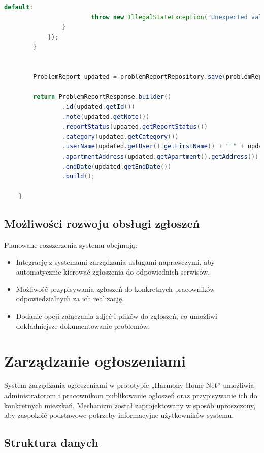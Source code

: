 \begin{lstlisting}[language=Java, style=JavaStyle, caption=Aktualizacja zgłoszenia problemu.]
                    default:
                        throw new IllegalStateException("Unexpected value: " + notificationType.getType());
                }
            });
        }


        ProblemReport updated = problemReportRepository.save(problemReportToUpdate);

        return ProblemReportResponse.builder()
                .id(updated.getId())
                .note(updated.getNote())
                .reportStatus(updated.getReportStatus())
                .category(updated.getCategory())
                .userName(updated.getUser().getFirstName() + " " + updated.getUser().getLastName())
                .apartmentAddress(updated.getApartment().getAddress())
                .endDate(updated.getEndDate())
                .build();

    }
\end{lstlisting}

\subsection{Możliwości rozwoju obsługi zgłoszeń}
Planowane rozszerzenia systemu obejmują:
\begin{itemize}
    \item Integrację z systemami zarządzania usługami naprawczymi, aby automatycznie kierować zgłoszenia do odpowiednich serwisów.
    \item Możliwość przypisywania zgłoszeń do konkretnych pracowników odpowiedzialnych za ich realizację.
    \item Dodanie opcji załączania zdjęć i plików do zgłoszeń, co umożliwi dokładniejsze dokumentowanie problemów.
\end{itemize}

\section{Zarządzanie ogłoszeniami}

System zarządzania ogłoszeniami w prototypie „Harmony Home Net” umożliwia administratorom i pracownikom publikowanie ogłoszeń oraz przypisywanie ich do konkretnych mieszkań. Mechanizm został zaprojektowany w sposób uproszczony, aby zaspokoić podstawowe potrzeby informacyjne użytkowników systemu.

\subsection{Struktura danych}

